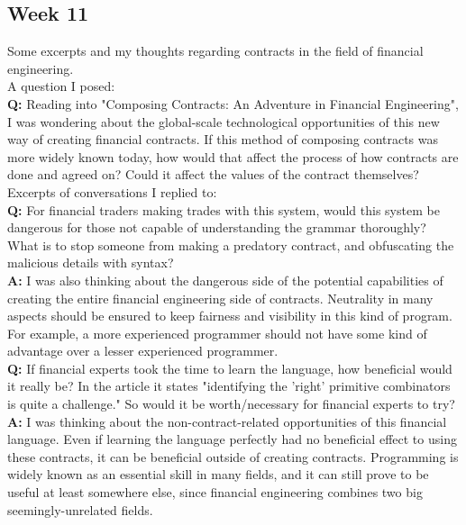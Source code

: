 \documentclass{article}
\theoremstyle{theorem}
\theoremstyle{definition}
\theoremstyle{remark}
\begin{document}
\subsection{Week 11}
Some excerpts and my thoughts regarding contracts in the field of financial engineering.\\

\noindent A question I posed:\\

\textbf{Q:} Reading into "Composing Contracts: An Adventure in Financial Engineering", I was wondering about the global-scale technological opportunities of this new way of creating financial contracts. If this method of composing contracts was more widely known today, how would that affect the process of how contracts are done and agreed on? Could it affect the values of the contract themselves?\\

\noindent Excerpts of conversations I replied to:\\

\textbf{Q:} For financial traders making trades with this system, would this system be dangerous for those not capable of understanding the grammar thoroughly? What is to stop someone from making a predatory contract, and obfuscating the malicious details with syntax?\\

\textbf{A:} I was also thinking about the dangerous side of the potential capabilities of creating the entire financial engineering side of contracts. Neutrality in many aspects should be ensured to keep fairness and visibility in this kind of program. For example, a more experienced programmer should not have some kind of advantage over a lesser experienced programmer.\\

\textbf{Q:} If financial experts took the time to learn the language, how beneficial would it really be? In the article it states "identifying the 'right' primitive combinators is quite a challenge." So would it be worth/necessary for financial experts to try? \\

\textbf{A:} I was thinking about the non-contract-related opportunities of this financial language. Even if learning the language perfectly had no beneficial effect to using these contracts, it can be beneficial outside of creating contracts. Programming is widely known as an essential skill in many fields, and it can still prove to be useful at least somewhere else, since financial engineering combines two big seemingly-unrelated fields.
\end{document}
